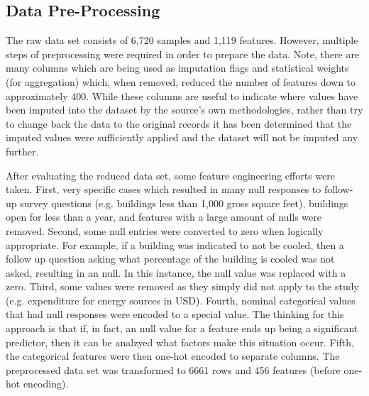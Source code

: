 \subsection{Data Pre-Processing}

The raw data set consists of 6,720 samples and 1,119 features.  However, multiple steps of preprocessing were required in order to prepare the data.  Note, there are many columns which are being used as imputation flags and statistical weights (for aggregation) which, when removed, reduced the number of features down to approximately 400.  While these columns are useful to indicate where values have been imputed into the dataset by the source's own methodologies, rather than try to change back the data to the original records it has been determined that the imputed values were sufficiently applied and the dataset will not be imputed any further.

After evaluating the reduced data set, some feature engineering efforts were taken.  First, very specific cases which resulted in many null responses to follow-up survey questions (e.g. buildings less than 1,000 gross square feet), buildings open for less than a year, and features with a large amount of nulls were removed.  Second, some null entries were converted to zero when logically appropriate.  For example, if a building was indicated to not be cooled, then a follow up question asking what percentage of the building is cooled was not asked, resulting in an null.  In this instance, the null value was replaced with a zero.  Third, some values were removed as they simply did not apply to the study (e.g. expenditure for energy sources in USD).  Fourth, nominal categorical values that had null responses were encoded to a special value.  The thinking for this approach is that if, in fact, an null value for a feature ends up being a significant predictor, then it can be analzyed what factors make this situation occur.  Fifth, the categorical features were then one-hot encoded to separate columns.  The preprocessed data set was transformed to 6661 rows and 456 features (before one-hot encoding).